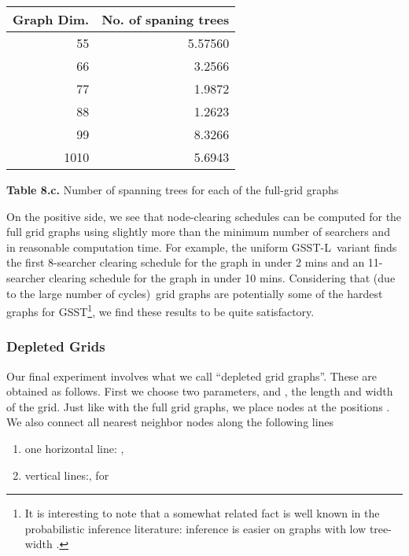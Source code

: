 \documentclass[11pt]{article}\usepackage{amsmath}
\begin{document}
\begin{center}\begin{tabular}
[c]{|l|r|}\hline
\textbf{Graph Dim.} & \textbf{No. of spaning trees}\\\hline
\multicolumn{1}{|r|}{55} & 5.57560\\\hline
\multicolumn{1}{|r|}{66} & 3.2566\\\hline
\multicolumn{1}{|r|}{77} & 1.9872\\\hline
\multicolumn{1}{|r|}{88} & 1.2623\\\hline
\multicolumn{1}{|r|}{99} & 8.3266\\\hline
\multicolumn{1}{|r|}{1010} & 5.6943\\\hline
\end{tabular}


\textbf{Table 8.c. }Number of spanning trees for each of the full-grid graphs


\end{center}

On the positive side, we see that node-clearing schedules can be computed for
the full grid graphs using slightly more than the minimum number of searchers
and in reasonable computation time. For example, the uniform GSST-L\ variant
finds the first 8-searcher clearing schedule for the  graph in under
2 mins and an 11-searcher clearing schedule for the  graph in under
10 mins. Considering that (due to the large number of cycles)\ grid graphs are
potentially some of the hardest graphs for GSST\footnote{It is interesting to
note that a somewhat related fact is well known in the probabilistic inference
literature: inference is easier on graphs with low tree-width \cite{Chavira}.}, we find these results to be quite satisfactory.

\subsubsection{Depleted Grids}

Our final experiment involves what we call \textquotedblleft depleted grid
graphs\textquotedblright. These are obtained as follows. First we choose two
parameters,  and , the length and width of the grid. Just like
with the full grid graphs, we place nodes at the positions . We also connect all nearest neighbor nodes along the
following lines

\begin{enumerate}
\item one horizontal line: ,

\item  vertical lines:, for 
\end{enumerate}
\end{document}
